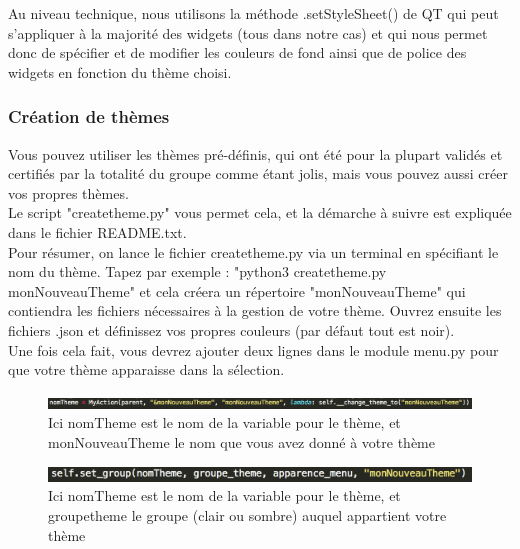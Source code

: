 \documentclass[a4paper,12pt]{article}
\begin{document}
			Au niveau technique, nous utilisons la méthode .setStyleSheet() de QT qui peut s'appliquer à la majorité des widgets (tous dans notre cas) et qui nous permet donc de spécifier et de modifier les couleurs de fond ainsi que de police des widgets en fonction du thème choisi.
			
			\subsubsection{Création de thèmes}
		
			Vous pouvez utiliser les thèmes pré-définis, qui ont été pour la plupart validés et certifiés par la totalité du groupe comme étant jolis, mais vous pouvez aussi créer vos propres thèmes.\\
			
			Le script "createtheme.py" vous permet cela, et la démarche à suivre est expliquée dans le fichier README.txt.\\
			
			Pour résumer, on lance le fichier createtheme.py via un terminal en spécifiant le nom du thème. Tapez par exemple :
			"python3 createtheme.py monNouveauTheme" et cela créera un répertoire "monNouveauTheme" qui contiendra les fichiers nécessaires à la gestion de votre thème. Ouvrez ensuite les fichiers .json et définissez vos propres couleurs (par défaut tout est noir).\\
			
			Une fois cela fait, vous devrez ajouter deux lignes dans le module menu.py pour que votre thème apparaisse dans la sélection.

			\begin{figure}[h!]
				\begin{center}
					\includegraphics[scale=0.5]{images/imgs_themes/add2}
					\caption{Ici nomTheme est le nom de la variable pour le thème, et monNouveauTheme le nom que vous avez donné à votre thème}
				\end{center}
			\end{figure}
			\begin{figure}[h!]
				\begin{center}
					\includegraphics[scale=0.7]{images/imgs_themes/add1}
					\caption{Ici nomTheme est le nom de la variable pour le thème, et groupetheme le groupe (clair ou sombre) auquel appartient votre thème}
				\end{center}
			\end{figure}
			
\end{document}
